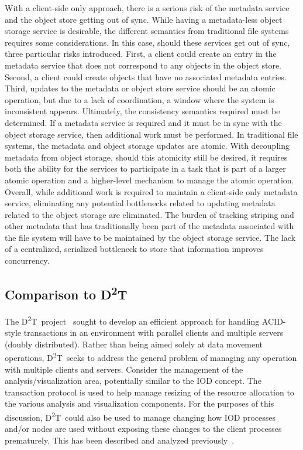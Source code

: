 \documentclass[conference]{sig-alt-gov2}
\newcommand{\DDT}{D\textsuperscript{2}T~}
\newcommand{\DDTns}{D\textsuperscript{2}T}
\begin{document}
With a client-side only approach, there is a serious risk of the metadata
service and the object store getting out of sync.  While having a metadata-less
object storage service is desirable, the different semantics from traditional
file systems requires some considerations. In this case, should these services
get out of sync, three particular risks introduced.  First, a client could
create an entry in the metadata service that does not correspond to any objects
in the object store. Second, a client could create objects that have no
associated metadata entries. Third, updates to the metadata or object store
service should be an atomic operation, but due to a lack of coordination, a
window where the system is inconsistent appears.  Ultimately, the consistency
semantics required must be determined. If a metadata service is required and it
must be in sync with the object storage service, then additional work must be
performed. In traditional file systems, the metadata and object storage updates
are atomic. With decoupling metadata from object storage, should this atomicity
still be desired, it requires both the ability for the services to participate
in a task that is part of a larger atomic operation and a higher-level
mechanism to manage the atomic operation. Overall, while additional work is
required to maintain a client-side only metadata service, eliminating any
potential bottlenecks related to updating metadata related to the object
storage are eliminated. The burden of tracking striping and other metadata that
has traditionally been part of the metadata associated with the file system
will have to be maintained by the object storage service. The lack of a
centralized, serialized bottleneck to store that information improves
concurrency.

\subsection{Comparison to \DDTns}
The \DDT project~\cite{lofstead:2012:txn} sought to develop an efficient
approach for handling ACID-style transactions in an environment with parallel
clients and multiple servers (doubly distributed). Rather than being aimed
solely at data movement operations, \DDT seeks to address the general problem
of managing any operation with multiple clients and servers.  Consider the
management of the analysis/visualization area, potentially similar to the IOD
concept. The transaction protocol is used to help manage resizing of the
resource allocation to the various analysis and visualization components.  For
the purposes of this discussion, \DDT could also be used to manage changing how
IOD processes and/or nodes are used without exposing these changes to the
client processes prematurely.  This has been described and analyzed
previously~\cite{dayal:2013:io-containers}.
\end{document}
